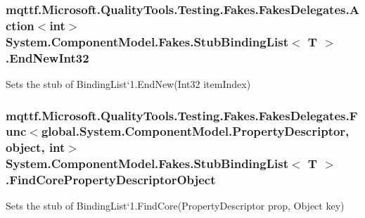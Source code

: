 \hypertarget{class_system_1_1_component_model_1_1_fakes_1_1_stub_binding_list_3_01_t_01_4_a1f00936569130f6c5083131d467935c2}{
\subsubsection[{End\-New\-Int32}]{\setlength{\rightskip}{0pt plus 5cm}mqttf.\-Microsoft.\-Quality\-Tools.\-Testing.\-Fakes.\-Fakes\-Delegates.\-Action$<$int$>$ System.\-Component\-Model.\-Fakes.\-Stub\-Binding\-List$<$ T $>$.End\-New\-Int32}}\label{class_system_1_1_component_model_1_1_fakes_1_1_stub_binding_list_3_01_t_01_4_a1f00936569130f6c5083131d467935c2}


Sets the stub of Binding\-List`1.End\-New(\-Int32 item\-Index)

\hypertarget{class_system_1_1_component_model_1_1_fakes_1_1_stub_binding_list_3_01_t_01_4_aebcbd4d277a372c5c492406f16eb4d35}{
\subsubsection[{Find\-Core\-Property\-Descriptor\-Object}]{\setlength{\rightskip}{0pt plus 5cm}mqttf.\-Microsoft.\-Quality\-Tools.\-Testing.\-Fakes.\-Fakes\-Delegates.\-Func$<$global.\-System.\-Component\-Model.\-Property\-Descriptor, object, int$>$ System.\-Component\-Model.\-Fakes.\-Stub\-Binding\-List$<$ T $>$.Find\-Core\-Property\-Descriptor\-Object}}\label{class_system_1_1_component_model_1_1_fakes_1_1_stub_binding_list_3_01_t_01_4_aebcbd4d277a372c5c492406f16eb4d35}


Sets the stub of Binding\-List`1.Find\-Core(\-Property\-Descriptor prop, Object key)

